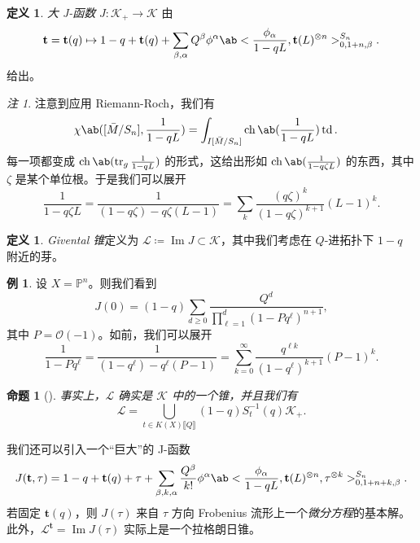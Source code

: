 \documentclass{amsart}
\newtheorem{prop}[thm]{命题}
\theoremstyle{definition}
\newtheorem{defn}[thm]{定义}
\newtheorem{exm}[thm]{例}
\theoremstyle{remark}
\newtheorem{rmk}[thm]{注}
\theoremstyle{plain}
\theoremstyle{definition}
\theoremstyle{remark}
\DeclareMathOperator{\Ima}{Im}
\renewcommand{\P}{\mathbb{P}}
\newcommand{\mc}[1]{\mathcal{#1}}
\newcommand{\on}[1]{\operatorname{#1}}
\newcommand{\1}{\mathbf{1}}
\newcommand{\2}{\mathbf{2}}
\newcommand{\3}{\mathbf{3}}
\newcommand{\ps}[1]{\llbracket #1 \rrbracket}
\begin{document}
\begin{defn}
    \textit{大 J-函数} \(J \colon \mc{K}_+ \to \mc{K}\) 由
    \[ \mathbf{t} = \mathbf{t}(q) \mapsto 1 - q + \mathbf{t}(q) + \sum_{\beta, \alpha} Q^{\beta} \phi^{\alpha} \ab< \frac{\phi_{\alpha}}{1-qL}, \mathbf{t}(L)^{\otimes n}>_{0, 1+n, \beta}^{S_n}. \]
    给出。
\end{defn}

\begin{rmk}
    注意到应用 Riemann-Roch，我们有
    \begin{align*}
        \chi\ab([\bar{M}/S_n], \frac{1}{1-qL}) &= \int_{I[\bar{M}/S_n]} \on{ch}\ab(\frac{1}{1-qL}) \on{td}.
    \end{align*}
    每一项都变成 \(\on{ch}\ab(\on{tr}_g \frac{1}{1-qL})\) 的形式，这给出形如 \(\on{ch}\ab(\frac{1}{1-q\zeta L})\) 的东西，其中 \(\zeta\) 是某个单位根。于是我们可以展开
    \[ \frac{1}{1-q\zeta L} = \frac{1}{(1-q \zeta) - q\zeta (L-1)} = \sum_k \frac{(q\zeta)^k}{(1-q\zeta)^{k+1}}(L-1)^k. \]
\end{rmk}

\begin{defn}
    \textit{Givental 锥}定义为 \(\mc{L} \coloneqq \Ima J \subset \mc{K}\)，其中我们考虑在 \(Q\)-进拓扑下 \(1-q\) 附近的芽。
\end{defn}

\begin{exm}
    设 \(X = \P^n\)。则我们看到
    \[ J(0) = (1-q) \sum_{d \geq 0} \frac{Q^d}{\prod_{\ell=1}^d (1-Pq^{\ell})^{n+1}}, \]
    其中 \(P = \mc{O}(-1)\)。如前，我们可以展开
    \[ \frac{1}{1-P q^{\ell}} = \frac{1}{(1-q^{\ell}) - q^{\ell}(P-1)} = \sum_{k=0}^{\infty} \frac{q^{\ell k}}{(1-q^{\ell})^{k+1}}(P-1)^k. \]
\end{exm}

\begin{prop}[{\cite{GiventalK7}}]
    事实上，\(\mc{L}\) 确实是 \(\mc{K}\) 中的一个锥，并且我们有
    \[ \mc{L} = \bigcup_{t \in K(X)\ps{Q}} (1-q) S_{t}^{-1}(q) \mc{K}_+. \]
\end{prop}

我们还可以引入一个“巨大”的 J-函数
\[ J(\mathbf{t}, \tau) = 1-q + \mathbf{t}(q) + \tau + \sum_{\beta, k, \alpha} \frac{Q^{\beta}}{k!} \phi^{\alpha} \ab< \frac{\phi_{\alpha}}{1-qL}, \mathbf{t}(L)^{\otimes n}, \tau^{\otimes k}>_{0,1+n+k,\beta}^{S_n}. \]
若固定 \(\mathbf{t}(q)\)，则 \(J(\tau)\) 来自 \(\tau\) 方向 Frobenius 流形上一个\textit{微分方程}的基本解。此外，\(\mc{L}^{\mathbf{t}}=  \Ima J(\tau)\) 实际上是一个拉格朗日锥。
\end{document}
